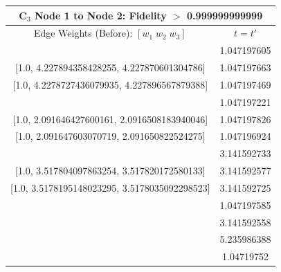 \documentclass[reprint, aps, 12pt, floatfix]{revtex4-2}
\begin{document}
\begin{center}
    \begin{tabular}{||c c||}
        \multicolumn{2}{c}{C$_3$ Node 1 to Node 2: Fidelity $>$ 0.999999999999}\\
        \hline
        Edge Weights (Before): $[w_1 \; w_2 \; w_3]$&$t=t'$\\
        \hline
        [1.0, 4.227894604123888, 4.2278708639953315]&1.047197605\\

        [1.0, 4.227894358428255, 4.227870601304786]&1.047197663\\

        [1.0, 4.2278727436079935, 4.227896567879388]&1.047197469\\
        \hline
        [1.0, 2.0916504914527674, 2.0916518974342933]&1.047197221\\

        [1.0, 2.091646427600161, 2.0916508183940046]&1.047197826\\

        [1.0, 2.091647603070719, 2.091650822524275]&1.047196924\\
        \hline
        [1.0, 3.5178195270160675, 3.51780347526475]&3.141592733\\

        [1.0, 3.517804097863254, 3.517820172580133]&3.141592577\\

        [1.0, 3.5178195148023295, 3.5178035092298523]&3.141592725\\
        \hline
        [1.0, 6.354103832062821, 6.354159432824193]&1.047197585\\
        \hline
        [1.0, 2.8062481729441497, 2.8062385387190467]&3.141592558\\
        \hline
        [1.0, 0.23452109465991697, 0.23452208917607806]&5.235986388\\
        \hline
        [1.0, 6.354161192366017, 6.3541055655312855]&1.04719752\\
        \hline
    \end{tabular}
\end{center}
\end{document}
